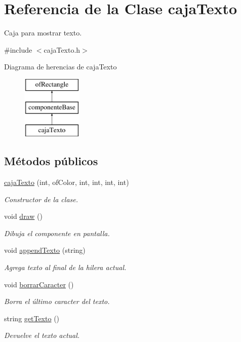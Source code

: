 \hypertarget{classcaja_texto}{}\section{Referencia de la Clase caja\+Texto}
\label{classcaja_texto}


Caja para mostrar texto.  




{\ttfamily \#include $<$caja\+Texto.\+h$>$}

Diagrama de herencias de caja\+Texto\begin{figure}[H]
\begin{center}
\leavevmode
\includegraphics[height=3.000000cm]{classcaja_texto}
\end{center}
\end{figure}
\subsection*{Métodos públicos}
\begin{DoxyCompactItemize}
\item 
\hyperlink{classcaja_texto_aee455629d334f28613f43b6a61d16f14}{caja\+Texto} (int, of\+Color, int, int, int, int)
\begin{DoxyCompactList}\small\item\em Constructor de la clase. \end{DoxyCompactList}\item 
void \hyperlink{classcaja_texto_a5bc02d7f55e12fd32715e4509853a558}{draw} ()
\begin{DoxyCompactList}\small\item\em Dibuja el componente en pantalla. \end{DoxyCompactList}\item 
void \hyperlink{classcaja_texto_ae6326da3ec5842eb0ff41208d22b1567}{append\+Texto} (string)
\begin{DoxyCompactList}\small\item\em Agrega texto al final de la hilera actual. \end{DoxyCompactList}\item 
void \hyperlink{classcaja_texto_ab9362a01f444db0bed5032b9ec585905}{borrar\+Caracter} ()
\begin{DoxyCompactList}\small\item\em Borra el último caracter del texto. \end{DoxyCompactList}\item 
string \hyperlink{classcaja_texto_ab5e4ed49e9aaa7176e9186b085a07621}{get\+Texto} ()
\begin{DoxyCompactList}\small\item\em Devuelve el texto actual. \end{DoxyCompactList}\end{DoxyCompactItemize}
